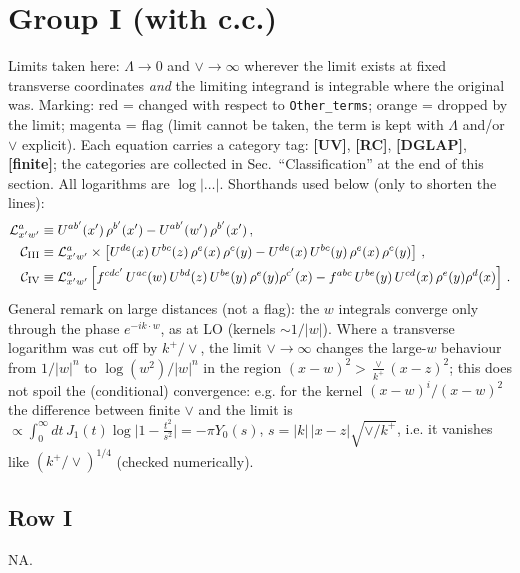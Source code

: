 \documentclass[9pt]{article}
\numberwithin{equation}{section}
\begin{document}
\section{Group I (with c.c.)}
\noindent Limits taken here: $\Lambda\to0$ and $\vee\to\infty$ wherever the limit exists at fixed transverse coordinates \emph{and} the limiting integrand is integrable where the original was. Marking: {\color{red}red} = changed with respect to \texttt{Other\_terms}; {\color{orange}orange} = dropped by the limit; {\color{magenta}magenta} = flag (limit cannot be taken, the term is kept with $\Lambda$ and/or $\vee$ explicit). Each equation carries a category tag: \textbf{[UV]}, \textbf{[RC]}, \textbf{[DGLAP]}, \textbf{[finite]}; the categories are collected in Sec.~``Classification'' at the end of this section. All logarithms are $\log|\dots|$. Shorthands used below (only to shorten the lines):
\begin{align}
\mathcal{L}^{a}_{x'w'} &\equiv U^{ab'}(x')\,\rho^{b'}(x')-U^{ab'}(w')\,\rho^{b'}(x')\,,\notag\\
\mathcal{C}_{\rm III} &\equiv \mathcal{L}^{a}_{x'w'}\times\left[U^{de}(x)\,U^{bc}(z)\,\rho^{e}(x)\,\rho^{c}(y)-U^{de}(x)\,U^{bc}(y)\,\rho^{e}(x)\,\rho^{c}(y)\right]\,,\notag\\
\mathcal{C}_{\rm IV} &\equiv \mathcal{L}^{a}_{x'w'}\left[f^{cdc'}\,U^{ac}(w)\,U^{bd}(z)\,U^{be}(y)\,\rho^{e}(y)\rho^{c'}(x)-f^{abc}\,U^{be}(y)\,U^{cd}(x)\,\rho^{e}(y)\rho^{d}(x)\right]\,.\notag
\end{align}
General remark on large distances (not a flag): the $w$ integrals converge only through the phase $e^{-ik\cdot w}$, as at LO (kernels $\sim1/|w|$). Where a transverse logarithm was cut off by $k^{+}/\vee$, the limit $\vee\to\infty$ changes the large-$w$ behaviour from $1/|w|^{n}$ to $\log(w^{2})/|w|^{n}$ in the region $(x-w)^{2}>\frac{\vee}{k^{+}}(x-z)^{2}$; this does not spoil the (conditional) convergence: e.g. for the kernel $(x-w)^{i}/(x-w)^{2}$ the difference between finite $\vee$ and the limit is $\propto\int_{0}^{\infty}dt\,J_{1}(t)\log\big|1-\frac{t^{2}}{s^{2}}\big|=-\pi Y_{0}(s)$, $s=|k|\,|x-z|\sqrt{\vee/k^{+}}$, i.e. it vanishes like $(k^{+}/\vee)^{1/4}$ (checked numerically).

\subsection{Row I}
\textsc{NA}.
\end{document}
